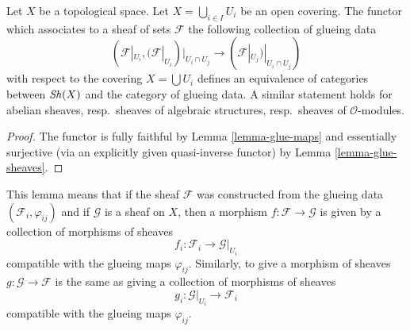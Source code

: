\begin{lemma}
\label{lemma-mapping-property-glue}
Let $X$ be a topological space.
Let $X = \bigcup_{i\in I} U_i$ be an open covering.
The functor which associates to a sheaf of
sets $\mathcal{F}$ the following collection of
glueing data
$$
(\mathcal{F}|_{U_i},
(\mathcal{F}|_{U_i})|_{U_i \cap U_j}
\to
(\mathcal{F}|_{U_j})|_{U_i \cap U_j}
)
$$
with respect to the covering $X = \bigcup U_i$
defines an equivalence of categories between
$\mathop{\mathit{Sh}}\nolimits(X)$ and the category of glueing
data. A similar statement holds for
abelian sheaves, resp.\ sheaves of algebraic structures,
resp.\ sheaves of $\mathcal{O}$-modules.
\end{lemma}

\begin{proof}
The functor is fully faithful by
Lemma \ref{lemma-glue-maps}
and essentially surjective (via an explicitly given quasi-inverse functor) by
Lemma \ref{lemma-glue-sheaves}.
\end{proof}

\noindent
This lemma means that if the sheaf $\mathcal{F}$ was constructed
from the glueing data $(\mathcal{F}_i, \varphi_{ij})$
and if $\mathcal{G}$ is a sheaf on $X$, then a morphism
$f : \mathcal{F} \to \mathcal{G}$ is given by a collection of
morphisms of sheaves
$$
f_i : \mathcal{F}_i \longrightarrow \mathcal{G}|_{U_i}
$$
compatible with the glueing maps $\varphi_{ij}$. Similarly,
to give a morphism of sheaves $g : \mathcal{G} \to \mathcal{F}$
is the same as giving a collection of morphisms of sheaves
$$
g_i : \mathcal{G}|_{U_i} \longrightarrow \mathcal{F}_i
$$
compatible with the glueing maps $\varphi_{ij}$.










